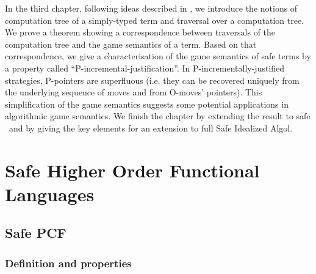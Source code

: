 In the third chapter, following ideas described in
\cite{OngLics2006}, we introduce the notions of computation tree of
a simply-typed term and traversal over a computation tree. We prove
a theorem showing a correspondence between traversals of the
computation tree and the game semantics of a term. Based on that
correspondence, we give a characterisation of the game semantics of
safe terms by a property called ``P-incremental-justification''. In
P-incrementally-justified strategies, P-pointers are superfluous (i.e.
they can be recovered uniquely from the underlying sequence of
moves and from O-moves' pointers). This simplification of the game semantics suggests some potential applications in algorithmic game semantics. We finish the
chapter by extending the result to safe \pcf\ and by giving the key
elements for an extension to full Safe Idealized Algol.




\chapter{Safe Higher Order Functional Languages}
\label{chap:safelambda}
    
    
    


    
    


    \section{Safe PCF}
        \subsection{Definition and properties}
